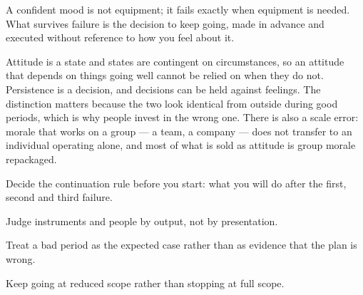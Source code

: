 


\begin{core}
A confident mood is not equipment; it fails exactly when equipment is needed. What survives failure is the decision to keep going, made in advance and executed without reference to how you feel about it.
\end{core}

\begin{mechanism}
Attitude is a state and states are contingent on circumstances, so an attitude that depends on things going well cannot be relied on when they do not. Persistence is a decision, and decisions can be held against feelings. The distinction matters because the two look identical from outside during good periods, which is why people invest in the wrong one. There is also a scale error: morale that works on a group --- a team, a company --- does not transfer to an individual operating alone, and most of what is sold as attitude is group morale repackaged.
\end{mechanism}

\begin{application}
  \item Decide the continuation rule before you start: what you will do after the first, second and third failure.
  \item Judge instruments and people by output, not by presentation.
  \item Treat a bad period as the expected case rather than as evidence that the plan is wrong.
  \item Keep going at reduced scope rather than stopping at full scope.
\end{application}

